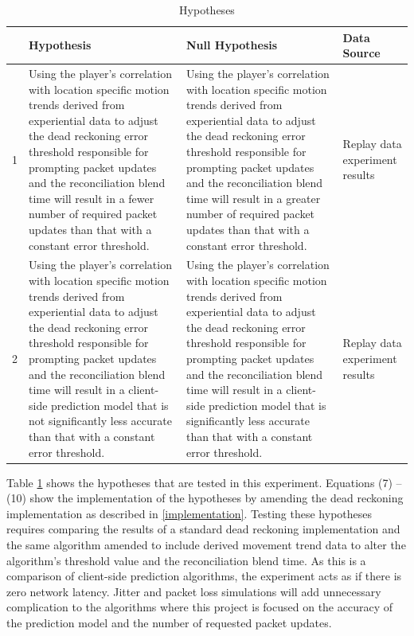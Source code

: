 \documentclass[journal]{IEEEtran}
\begin{document}
\begin{table}[t]
	\centering
	\caption{Hypotheses}
	\label{table:hypothesis}
	\def\arraystretch{1.5}
	\begin{tabular}{|c|p{7.1cm}|p{7.1cm}|p{1.5cm}|}
		\hline
		& \textbf{Hypothesis}& \textbf{Null Hypothesis} & \textbf{Data Source} \\ \hline
		1 & Using the player's correlation with location specific motion trends derived from experiential data to adjust the dead reckoning error threshold responsible for prompting packet updates and the reconciliation blend time will result in a fewer number of required packet updates than that with a constant error threshold.
		& Using the player's correlation with location specific motion trends derived from experiential data to adjust the dead reckoning error threshold responsible for prompting packet updates and the reconciliation blend time will result in a greater number of required packet updates than that with a constant error threshold.
		& Replay data experiment results \\ \hline
		2 & Using the player's correlation with location specific motion trends derived from experiential data to adjust the dead reckoning error threshold responsible for prompting packet updates and the reconciliation blend time will result in a client-side prediction model that is not significantly less accurate than that with a constant error threshold.
		& Using the player's correlation with location specific motion trends derived from experiential data to adjust the dead reckoning error threshold responsible for prompting packet updates and the reconciliation blend time will result in a client-side prediction model that is significantly less accurate than that with a constant error threshold.
		& Replay data experiment results \\ \hline
	\end{tabular}
\end{table}

Table \ref{table:hypothesis} shows the hypotheses that are tested in this experiment. Equations (7) -- (10) show the implementation of the hypotheses by amending the dead reckoning implementation as described in \ref{implementation}. Testing these hypotheses requires comparing the results of a standard dead reckoning implementation and the same algorithm amended to include derived movement trend data to alter the algorithm's threshold value and the reconciliation blend time. As this is a comparison of client-side prediction algorithms, the experiment acts as if there is zero network latency. Jitter and packet loss simulations will add unnecessary complication to the algorithms where this project is focused on the accuracy of the prediction model and the number of requested packet updates.
\end{document}
